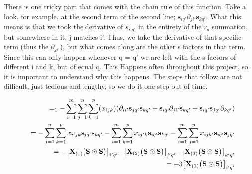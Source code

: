 \documentclass{article}
\begin{document}
There is one tricky part that comes with the chain rule of this function. Take a look, for example, at the second term of the second line; $\mathbf{s}_{iq'}\partial_{ji'} \mathbf{s}_{kq'}$. What this means is that we took the derivative of $s_{i'q'}$ in the entirety of the $r_\mathbf{s}$ summation, but somewhere in it, j matches i'. Thus, we take the derivative of that specific term (thus the $\partial_{ji'}$), but what comes along are the other s factors in that term. Since this can only happen whenever q = q' we are left with the s factors of different i and k, but of equal q. This Happens often throughout this project, so it is important to understand why this happens. The steps that follow are not difficult, just tedious and lengthy, so we do it one step out of time. 

\begin{eqnarray*}
    \lefteqn{}
    & & =_1 -\sum_{i=1}^m\sum_{j=1}^n\sum_{k=1}^p(x_{ijk})(\partial_{ii'} \mathbf{s}_{jq'}\mathbf{s}_{kq'} + \mathbf{s}_{iq'}\partial_{ji'} \mathbf{s}_{kq'} + \mathbf{s}_{iq'}\mathbf{s}_{jq'}\partial_{kq'}) \\
    & & = - \sum_{j=1}^n\sum_{k=1}^px_{i'jk}\mathbf{s}_{jq'}\mathbf{s}_{kq'} - \sum_{i=1}^m\sum_{k=1}^px_{ij'k}\mathbf{s}_{iq'}\mathbf{s}_{kq'} - \sum_{i=1}^m\sum_{j=1}^nx_{ijk'}\mathbf{s}_{iq'}\mathbf{s}_{jq'} \\
    & & = - \bigl[\mathbf{X}_{(1)}\bigl(\mathbf{S}\odot \mathbf{S}\bigl)\bigl]_{i'q'} - \bigl[\mathbf{X}_{(2)}\bigl(\mathbf{S}\odot \mathbf{S}\bigl)\bigl]_{j'q'} - \bigl[\mathbf{X}_{(3)}\bigl(\mathbf{S}\odot \mathbf{S}\bigl)\bigl]_{k'q'} \\
    & & = -3 \bigl[\mathbf{X}_{(1)} \bigl(\mathbf{S}\odot \mathbf{S}\bigl)\bigl]_{i'q'}
\end{eqnarray*}
\end{document}
